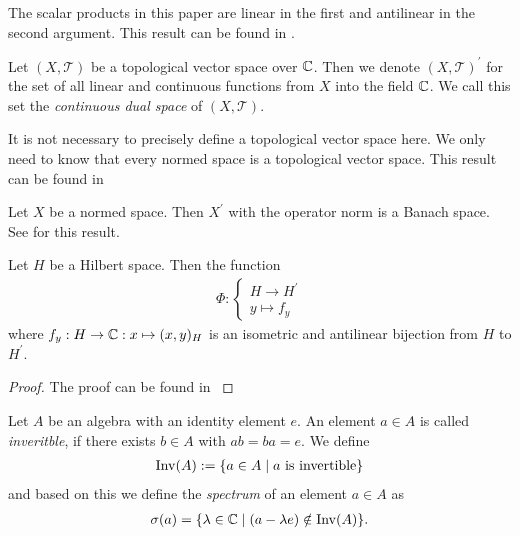\begin{remark}
	The scalar products in this paper are linear in the first and antilinear in the second argument. This result can be found in \cite[p. 41]{FAna1}.
\end{remark}

\begin{definition}
	Let $(X, \mathcal{T})$ be a topological vector space over $\mathbb{C}$. Then we denote $(X, \mathcal{T})^\prime$ for the set of all linear and continuous functions from $X$ into the field $\mathbb{C}$. We call this set the \textit{continuous dual space} of $(X, \mathcal{T})$.
\end{definition}

\begin{remark}
	It is not necessary to precisely define a topological vector space here. We only need to know that every normed space is a topological vector space. This result can be found in \cite[p. 18]{FAna1}
\end{remark}

\begin{remark}
	Let $X$ be a normed space. Then $X^\prime$ with the operator norm is a Banach space. See \cite[p. 25]{FAna1} for this result.
\end{remark}

\begin{proposition} \label{prop:riesz}
	Let $H$ be a Hilbert space. Then the function
	\begin{align*}
		\Phi: 
		\begin{cases}
			H \to H^\prime \\
			y \mapsto f_y
		\end{cases}
	\end{align*}
	where $f_y: H \to \mathbb{C}: x \mapsto (x,y)_H$ is an isometric and antilinear bijection from $H$ to $H^\prime$. 
\end{proposition}

\begin{proof}
	The proof can be found in \cite[p. 50]{FAna1}
\end{proof}

\begin{definition}
	Let $A$ be an algebra with an identity element $e$. An element $a \in A$ is called \textit{inveritble}, if there exists $b \in A$ with $ab = ba = e$. We define
	\begin{align*}
		\operatorname{Inv}(A) := \{a \in A \mid a \text{ is invertible}\}
	\end{align*}
	and based on this we define the \textit{spectrum} of an element $a \in A$ as
	\begin{align*}
		\sigma(a) = \{\lambda \in \mathbb{C} \mid (a - \lambda e) \notin \operatorname{Inv}(A)\}.
	\end{align*}
\end{definition}

